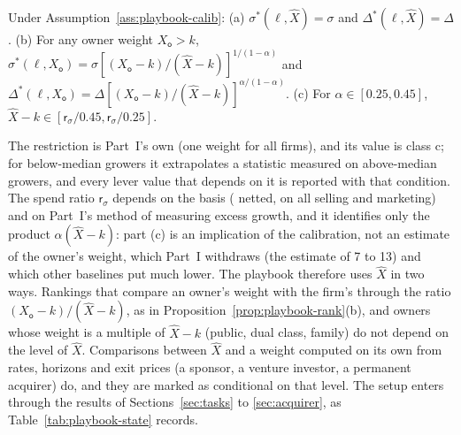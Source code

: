\begin{lemma}\label{lem:playbook-calib}
Under Assumption~\ref{ass:playbook-calib}: (a) $\sigma^*(\ell,\hat X)=\sigma$ and $\Delta^*(\ell,\hat X)=\Delta$. (b) For any owner weight $X_{\mathsf o}>k$, $\sigma^*(\ell,X_{\mathsf o})=\sigma[(X_{\mathsf o}-k)/(\hat X-k)]^{1/(1-\alpha)}$ and $\Delta^*(\ell,X_{\mathsf o})=\Delta[(X_{\mathsf o}-k)/(\hat X-k)]^{\alpha/(1-\alpha)}$. (c) For $\alpha\in[0.25,0.45]$, $\hat X-k\in[\mathsf r_\sigma/0.45,\mathsf r_\sigma/0.25]$.
\end{lemma}

The restriction is Part~I's own (one weight for all firms), and its value is class c; for below-median growers it extrapolates a statistic measured on above-median growers, and every lever value that depends on it is reported with that condition. The spend ratio $\mathsf r_\sigma$ depends on the basis (\SpendRatioPB{} netted, \SpendRatioPBAll{} on all selling and marketing) and on Part~I's method of measuring excess growth, and it identifies only the product $\alpha(\hat X-k)$: part (c) is an implication of the calibration, not an estimate of the owner's weight, which Part~I withdraws (the estimate of 7 to 13) and which other baselines put much lower. The playbook therefore uses $\hat X$ in two ways. Rankings that compare an owner's weight with the firm's through the ratio $(X_{\mathsf o}-k)/(\hat X-k)$, as in Proposition~\ref{prop:playbook-rank}(b), and owners whose weight is a multiple of $\hat X-k$ (public, dual class, family) do not depend on the level of $\hat X$. Comparisons between $\hat X$ and a weight computed on its own from rates, horizons and exit prices (a sponsor, a venture investor, a permanent acquirer) do, and they are marked as conditional on that level. %
The setup enters through the results of Sections~\ref{sec:tasks} to \ref{sec:acquirer}, as Table~\ref{tab:playbook-state} records.

